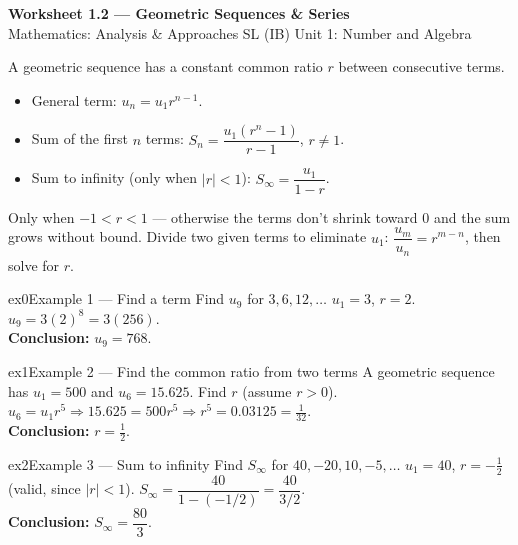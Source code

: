 \documentclass[11pt]{article}
\begin{document}
\begin{center}
{\LARGE\bfseries\color{titleblue}Worksheet 1.2 --- Geometric Sequences \& Series}\\[2pt]
{\small Mathematics: Analysis \& Approaches SL (IB) \textperiodcentered{} Unit 1: Number and Algebra}
\end{center}

\begin{ideabox}
A geometric sequence has a constant common ratio $r$ between consecutive terms.
\begin{itemize}[leftmargin=*,itemsep=2pt]
  \item General term: $u_n=u_1r^{n-1}$.
  \item Sum of the first $n$ terms: $S_n=\dfrac{u_1(r^n-1)}{r-1}$, $r\neq1$.
  \item Sum to infinity (only when $|r|<1$): $S_\infty=\dfrac{u_1}{1-r}$.
\end{itemize}
\end{ideabox}

\begin{learnbox}
Only when $-1<r<1$ --- otherwise the terms don't shrink toward 0 and the sum grows without bound.
Divide two given terms to eliminate $u_1$: $\dfrac{u_m}{u_n}=r^{m-n}$, then solve for $r$.
\end{learnbox}


\begin{example}{ex0}{Example 1 --- Find a term}
Find $u_9$ for $3,6,12,\dots$\soln
$u_1=3$, $r=2$. $u_9=3(2)^8=3(256)$.\\[3pt]\textbf{Conclusion:} $u_9=768$.
\end{example}

\begin{example}{ex1}{Example 2 --- Find the common ratio from two terms}
A geometric sequence has $u_1=500$ and $u_6=15.625$. Find $r$ (assume $r>0$).\soln
$u_6=u_1r^5\Rightarrow15.625=500r^5\Rightarrow r^5=0.03125=\tfrac{1}{32}$.\\[3pt]\textbf{Conclusion:} $r=\tfrac12$.
\end{example}

\begin{example}{ex2}{Example 3 --- Sum to infinity}
Find $S_\infty$ for $40,-20,10,-5,\dots$\soln
$u_1=40$, $r=-\tfrac12$ (valid, since $|r|<1$). $S_\infty=\dfrac{40}{1-(-1/2)}=\dfrac{40}{3/2}$.\\[3pt]\textbf{Conclusion:} $S_\infty=\dfrac{80}{3}$.
\end{example}
\end{document}
